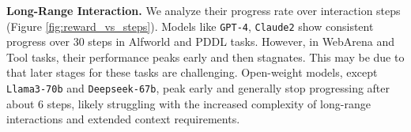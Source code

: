 \textbf{Long-Range Interaction.}  We analyze their progress rate over interaction steps (Figure \ref{fig:reward_vs_steps}). Models like \texttt{GPT-4}, \texttt{Claude2} show consistent progress over 30 steps in Alfworld and PDDL tasks. However, in WebArena and Tool tasks, their performance peaks early and then stagnates. This may be due to that later stages for these tasks are challenging.
Open-weight models, except \texttt{Llama3-70b} and \texttt{Deepseek-67b}, peak early and generally stop progressing after about 6 steps, likely struggling with the increased complexity of long-range interactions and extended context requirements.



